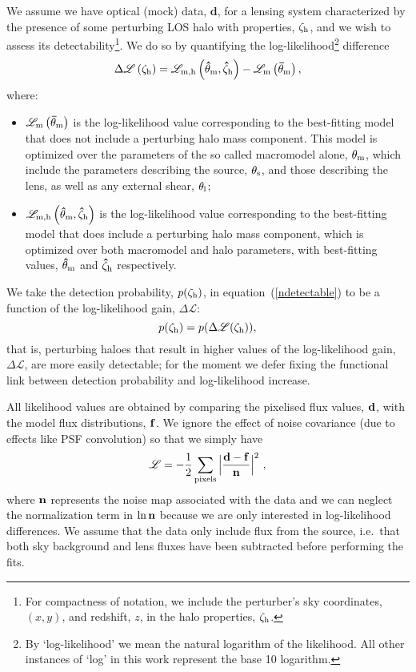 \documentclass[a4paper, fleqn, usenatbib, useAMS]{mnras}
\def\zh{\zeta_{\rm h}}
\def\DL{\Delta\mathscr{L}}
\begin{document}
We assume we have optical (mock) data, $\textbf{d}$, for a lensing system characterized by the presence of some perturbing 
LOS halo with properties, $\bf\zh$, and we wish to assess its detectability\footnote{For compactness of notation, we include the
perturber's sky coordinates, $(x,y)$, and redshift, $z$, in the halo
properties, $\zh$.}. We do so by quantifying the
log-likelihood\footnote{By `log-likelihood' we mean the natural
  logarithm of the likelihood. All other instances of `log' in this
  work represent the base 10 logarithm.}
difference
%
\begin{equation}
\DL \left( \bf\zh\right) = \mathscr{L}_{\rm m,h}\left(\bf{\hat\theta}_{\rm m}, \bf{\hat\zeta}_{\rm h}\right) - \mathscr{L}_{\rm m}\left(\bf{\bar\theta}_{\rm m}\right),
\label{DL}
\end{equation}
%
where:
\begin{itemize}
\item{$\mathscr{L}_{\rm m}\left(\bf{\bar\theta}_{\rm m}\right)$ is the log-likelihood value corresponding to the best-fitting model that does not include a 
perturbing halo mass component. This model is optimized over the parameters of the so called macromodel alone, $\bf{\theta}_{\rm m}$,
which include the parameters describing the source, $\bf{\theta}_{\rm
  s}$, and those describing the lens, as well as any external shear, $\bf{\theta}_{\rm l}$;}
\item{$\mathscr{L}_{\rm m,h}\left(\bf{\hat\theta}_{\rm m}, \bf{\hat\zeta}_{\rm h}\right)$ is the log-likelihood value corresponding to the best-fitting model 
that does include a perturbing halo mass component, which is optimized over both macromodel and halo parameters,
with best-fitting values, $\bf{\hat\theta}_{\rm m}$ and $\bf{\hat\zeta}_{\rm h}$ respectively.}
\end{itemize}
We take the detection probability, $p(\zh)$, in
equation~(\ref{ndetectable}) to be a function of the log-likelihood gain, $\DL$:
%
\begin{equation}
p(\zh) = p(\DL(\zh)), 
\label{pDL}
\end{equation}
%
that is, perturbing haloes that result in higher values of the
log-likelihood gain, $\DL$, are more easily detectable; 
for the moment we defer fixing the functional link between detection probability and log-likelihood increase.

All likelihood values are obtained by comparing the pixelised flux values, $\bf d$,
with the model flux distributions, $\bf f$. We ignore the effect of noise covariance (due to effects like PSF convolution) so that we simply have
\begin{equation}
\mathscr{L} = - {1\over 2} \sum_{\rm pixels} \Big|  {{{\bf d - \bf f}\over \bf n}} \Big|^2 \ ,
\label{calL}
\end{equation}
where $\bf n$ represents the noise map associated with the data and we
can neglect the normalization term in $\ln\bf n$ because 
we are only interested in log-likelihood differences. We assume that the data only include flux from the source, 
i.e.\ that both sky background and lens fluxes have been subtracted before performing the fits. 
\end{document}
